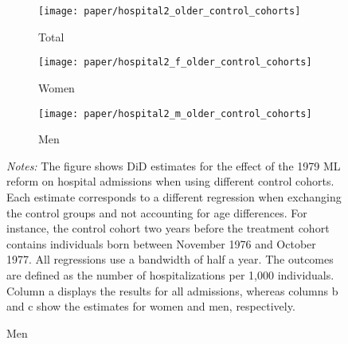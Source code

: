 \begin{landscape}
	\vspace*{\fill}
	\begin{figure}[H]\centering
		\caption{Potential spillover effects on older siblings for hospital admission}\label{fig_mlch: SUTVA_older_controls_hospital2}
		\begin{subfigure}[h]{0.31\linewidth}\centering\caption{Total}
			\texttt{[image: paper/hospital2\_older\_control\_cohorts]}
		\end{subfigure}
		\begin{subfigure}[h]{0.31\linewidth}\centering\caption{Women}
			\texttt{[image: paper/hospital2\_f\_older\_control\_cohorts]}
		\end{subfigure}
		\begin{subfigure}[h]{0.31\linewidth}\centering\caption{Men}
			\texttt{[image: paper/hospital2\_m\_older\_control\_cohorts]}
		\end{subfigure}
		\begin{minipage}{\linewidth}
			\scriptsize \emph{Notes:} The figure shows DiD estimates for the effect of the 1979 ML reform on hospital admissions when using different control cohorts. Each estimate corresponds to a different regression when exchanging the control groups and not accounting for age differences. For instance, the control cohort two years before the treatment cohort contains individuals born between November 1976 and October 1977. All regressions use a bandwidth of half a year. The outcomes are defined as the number of hospitalizations per 1,000 individuals. Column a displays the results for all admissions, whereas columns b and c show the estimates for women and men, respectively.
		\end{minipage}
	\end{figure}
	\vspace*{\fill}\clearpage
\end{landscape}